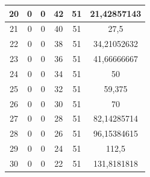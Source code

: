 \begin{table}[]
\begin{tabular}{|c|c|c|c|c|c|}
 			20                                           & 0                      & 0                     & 42                    & 51                     & 21,42857143                                        \\ \hline
 			21                                           & 0                      & 0                     & 40                    & 51                     & 27,5                                               \\ \hline
 			22                                           & 0                      & 0                     & 38                    & 51                     & 34,21052632                                        \\ \hline
 			23                                           & 0                      & 0                     & 36                    & 51                     & 41,66666667                                        \\ \hline
 			24                                           & 0                      & 0                     & 34                    & 51                     & 50                                                 \\ \hline
 			25                                           & 0                      & 0                     & 32                    & 51                     & 59,375                                             \\ \hline
 			26                                           & 0                      & 0                     & 30                    & 51                     & 70                                                 \\ \hline
 			27                                           & 0                      & 0                     & 28                    & 51                     & 82,14285714                                        \\ \hline
 			28                                           & 0                      & 0                     & 26                    & 51                     & 96,15384615                                        \\ \hline
 			29                                           & 0                      & 0                     & 24                    & 51                     & 112,5                                              \\ \hline
 			30                                           & 0                      & 0                     & 22                    & 51                     & 131,8181818                                        \\ \hline

\end{tabular}
\end{table}
